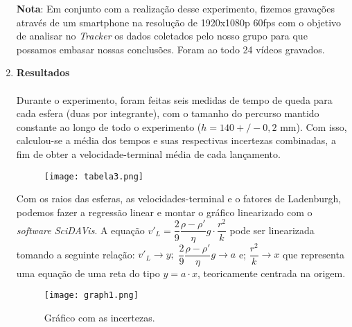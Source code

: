\documentclass[a4paper, 11pt]{article}
\begin{document}
\begin{enumerate}
\textbf{Nota}: Em conjunto com a realização desse experimento, fizemos gravações através de um smartphone na resolução de 1920x1080p 60fps com o objetivo de analisar no \textit{Tracker} os dados coletados pelo nosso grupo para que possamos embasar nossas conclusões. Foram ao todo 24 vídeos gravados.
\\


	\item \textbf{Resultados}
\paragraph{}
Durante o experimento, foram feitas seis medidas de tempo de queda para cada esfera (duas por integrante), com o tamanho do percurso mantido constante ao longo de todo o experimento ($h = 140 +/- 0,2$ mm). Com isso, calculou-se a média dos tempos e suas respectivas incertezas combinadas, a fim de obter a velocidade-terminal média de cada lançamento. 
\pagebreak

\begin{figure}[!h]
		\centering
		\texttt{[image: tabela3.png]}
		\end{figure}

Com os raios das esferas, as velocidades-terminal e o fatores de Ladenburgh, podemos fazer a regressão linear e montar o gráfico linearizado com o \textit{software SciDAVis}. A equação $v'_L = \dfrac{2}{9} \dfrac{\rho - \rho'}{\eta} g \cdot \dfrac{r^2}{k}$ pode ser linearizada tomando a seguinte relação:
$ v'_L \longrightarrow y; $
$ \dfrac{2}{9} \dfrac{\rho - \rho'}{\eta} g \longrightarrow a $ e;
$ \dfrac{r^2}{k} \longrightarrow x $
que representa uma equação de uma reta do tipo $y = a \cdot x$, teoricamente centrada na origem.
\\

\begin{figure}[htb]
		\centering
		\texttt{[image: graph1.png]}
		\caption{Gráfico com as incertezas.}
\end{figure}



\end{enumerate}
\end{document}
